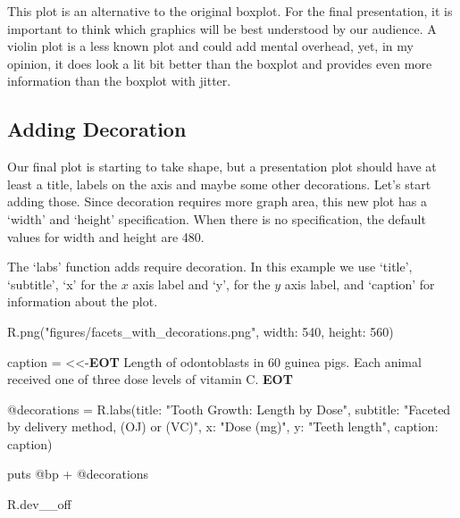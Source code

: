 \documentclass[11pt,]{article}
\newenvironment{Shaded}{\begin{snugshade}}{\end{snugshade}}
\newcommand{\KeywordTok}[1]{\textcolor[rgb]{0.13,0.29,0.53}{\textbf{#1}}}
\newcommand{\DecValTok}[1]{\textcolor[rgb]{0.00,0.00,0.81}{#1}}
\newcommand{\StringTok}[1]{\textcolor[rgb]{0.31,0.60,0.02}{#1}}
\newcommand{\OtherTok}[1]{\textcolor[rgb]{0.56,0.35,0.01}{#1}}
\newcommand{\NormalTok}[1]{#1}
\begin{document}
This plot is an alternative to the original boxplot. For the final
presentation, it is important to think which graphics will be best
understood by our audience. A violin plot is a less known plot and could
add mental overhead, yet, in my opinion, it does look a lit bit better
than the boxplot and provides even more information than the boxplot
with jitter.

\subsection{Adding Decoration}\label{adding-decoration}

Our final plot is starting to take shape, but a presentation plot should
have at least a title, labels on the axis and maybe some other
decorations. Let's start adding those. Since decoration requires more
graph area, this new plot has a `width' and `height' specification. When
there is no specification, the default values for width and height are
480.

The `labs' function adds require decoration. In this example we use
`title', `subtitle', `x' for the \(x\) axis label and `y', for the \(y\)
axis label, and `caption' for information about the plot.

\begin{Shaded}
\begin{Highlighting}[]
\NormalTok{R.png(}\StringTok{"figures/facets_with_decorations.png"}\NormalTok{, }\StringTok{width: }\DecValTok{540}\NormalTok{, }\StringTok{height: }\DecValTok{560}\NormalTok{)}

\NormalTok{caption = <<-}\KeywordTok{EOT}
\OtherTok{Length of odontoblasts in 60 guinea pigs. }
\OtherTok{Each animal received one of three dose levels of vitamin C.}
\KeywordTok{EOT}

\OtherTok{@decorations}\NormalTok{ =}
\NormalTok{  R.labs(}\StringTok{title: "Tooth Growth:  Length by Dose"}\NormalTok{,}
         \StringTok{subtitle: "Faceted by delivery method, (OJ) or (VC)"}\NormalTok{,}
         \StringTok{x: "Dose (mg)"}\NormalTok{, }\StringTok{y: "Teeth length"}\NormalTok{,}
         \StringTok{caption: }\NormalTok{caption)}

\NormalTok{puts }\OtherTok{@bp}\NormalTok{ + }\OtherTok{@decorations}

\NormalTok{R.dev__off}
\end{Highlighting}
\end{Shaded}
\end{document}
